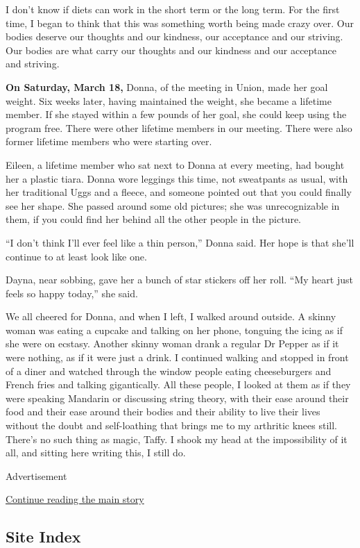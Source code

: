 I don't know if diets can work in the short term or the long term. For
the first time, I began to think that this was something worth being
made crazy over. Our bodies deserve our thoughts and our kindness, our
acceptance and our striving. Our bodies are what carry our thoughts and
our kindness and our acceptance and striving.

\textbf{On Saturday, March 18,} Donna, of the meeting in Union, made her
goal weight. Six weeks later, having maintained the weight, she became a
lifetime member. If she stayed within a few pounds of her goal, she
could keep using the program free. There were other lifetime members in
our meeting. There were also former lifetime members who were starting
over.

Eileen, a lifetime member who sat next to Donna at every meeting, had
bought her a plastic tiara. Donna wore leggings this time, not
sweatpants as usual, with her traditional Uggs and a fleece, and someone
pointed out that you could finally see her shape. She passed around some
old pictures; she was unrecognizable in them, if you could find her
behind all the other people in the picture.

``I don't think I'll ever feel like a thin person,'' Donna said. Her
hope is that she'll continue to at least look like one.

Dayna, near sobbing, gave her a bunch of star stickers off her roll.
``My heart just feels so happy today,'' she said.

We all cheered for Donna, and when I left, I walked around outside. A
skinny woman was eating a cupcake and talking on her phone, tonguing the
icing as if she were on ecstasy. Another skinny woman drank a regular Dr
Pepper as if it were nothing, as if it were just a drink. I continued
walking and stopped in front of a diner and watched through the window
people eating cheeseburgers and French fries and talking gigantically.
All these people, I looked at them as if they were speaking Mandarin or
discussing string theory, with their ease around their food and their
ease around their bodies and their ability to live their lives without
the doubt and self-loathing that brings me to my arthritic knees still.
There's no such thing as magic, Taffy. I shook my head at the
impossibility of it all, and sitting here writing this, I still do.

Advertisement

\protect\hyperlink{after-bottom}{Continue reading the main story}

\hypertarget{site-index}{%
\subsection{Site Index}\label{site-index}}

